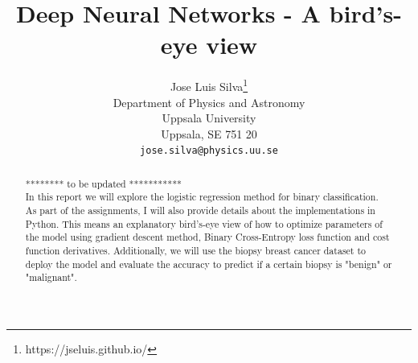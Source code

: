 \documentclass{article}
\title{Deep Neural Networks - A bird's-eye view}
\author{%
  Jose Luis Silva\thanks{https://jseluis.github.io/} \\
  Department of Physics and Astronomy\\
  Uppsala University\\
  Uppsala, SE 751 20 \\
  \texttt{jose.silva@physics.uu.se} \\
}
\begin{document}

\maketitle

\begin{abstract}
******** to be updated ***********\\
In this report we will explore the logistic regression method for binary classification. As part of the assignments, I will also provide details about the implementations in Python. This means an explanatory bird's-eye view of how to optimize parameters of the model using gradient descent method, Binary Cross-Entropy loss function and cost function derivatives. Additionally, we will use the biopsy breast cancer dataset to deploy the model and evaluate the accuracy to predict if a certain biopsy is "benign" or "malignant".
\end{abstract}
\end{document}
